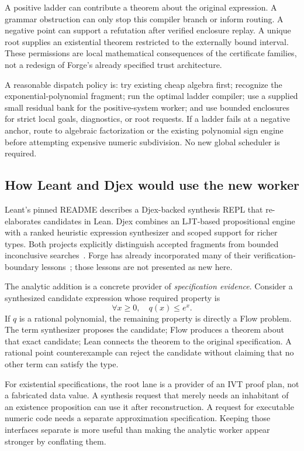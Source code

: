 A positive ladder can contribute a theorem about the original expression. A grammar obstruction can only stop this compiler branch or inform routing. A negative point can support a refutation after verified enclosure replay. A unique root supplies an existential theorem restricted to the externally bound interval. These permissions are local mathematical consequences of the certificate families, not a redesign of Forge's already specified trust architecture.

A reasonable dispatch policy is: try existing cheap algebra first; recognize the exponential-polynomial fragment; run the optimal ladder compiler; use a supplied small residual bank for the positive-system worker; and use bounded enclosures for strict local goals, diagnostics, or root requests. If a ladder fails at a negative anchor, route to algebraic factorization or the existing polynomial sign engine before attempting expensive numeric subdivision. No new global scheduler is required.

\subsection{How Leant and Djex would use the new worker}

Leant's pinned README describes a Djex-backed synthesis REPL that re-elaborates candidates in Lean. Djex combines an LJT-based propositional engine with a ranked heuristic expression synthesizer and scoped support for richer types. Both projects explicitly distinguish accepted fragments from bounded inconclusive searches~\cite{leant,djex}. Forge has already incorporated many of their verification-boundary lessons~\cite{forge-neighbors}; those lessons are not presented as new here.

The analytic addition is a concrete provider of \emph{specification evidence}. Consider a synthesized candidate expression whose required property is
\[
 \forall x\ge0,\quad q(x)\le e^x.
\]
If $q$ is a rational polynomial, the remaining property is directly a Flow problem. The term synthesizer proposes the candidate; Flow produces a theorem about that exact candidate; Lean connects the theorem to the original specification. A rational point counterexample can reject the candidate without claiming that no other term can satisfy the type.

For existential specifications, the root lane is a provider of an IVT proof plan, not a fabricated data value. A synthesis request that merely needs an inhabitant of an existence proposition can use it after reconstruction. A request for executable numeric code needs a separate approximation specification. Keeping those interfaces separate is more useful than making the analytic worker appear stronger by conflating them.

